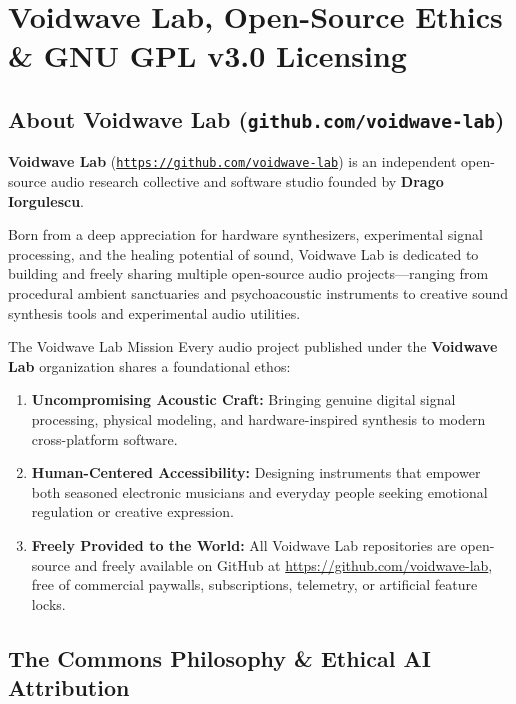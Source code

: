 \documentclass[11pt,oneside,openany]{book}
\begin{document}
\chapter[Voidwave Lab \& Licensing]{Voidwave Lab, Open-Source Ethics \& GNU GPL v3.0 Licensing}

\section{About Voidwave Lab (\texttt{github.com/voidwave-lab})}

\textbf{Voidwave Lab} (\href{https://github.com/voidwave-lab}{\texttt{https://github.com/voidwave-lab}}) is an independent open-source audio research collective and software studio founded by \textbf{Drago Iorgulescu}.

Born from a deep appreciation for hardware synthesizers, experimental signal processing, and the healing potential of sound, Voidwave Lab is dedicated to building and freely sharing multiple open-source audio projects---ranging from procedural ambient sanctuaries and psychoacoustic instruments to creative sound synthesis tools and experimental audio utilities.

\begin{sanctuarybox}{The Voidwave Lab Mission}
Every audio project published under the \textbf{Voidwave Lab} organization shares a foundational ethos:
\begin{enumerate}
  \item \textbf{Uncompromising Acoustic Craft:} Bringing genuine digital signal processing, physical modeling, and hardware-inspired synthesis to modern cross-platform software.
  \item \textbf{Human-Centered Accessibility:} Designing instruments that empower both seasoned electronic musicians and everyday people seeking emotional regulation or creative expression.
  \item \textbf{Freely Provided to the World:} All Voidwave Lab repositories are open-source and freely available on GitHub at \url{https://github.com/voidwave-lab}, free of commercial paywalls, subscriptions, telemetry, or artificial feature locks.
\end{enumerate}
\end{sanctuarybox}

\section{The Commons Philosophy \& Ethical AI Attribution}
\end{document}
